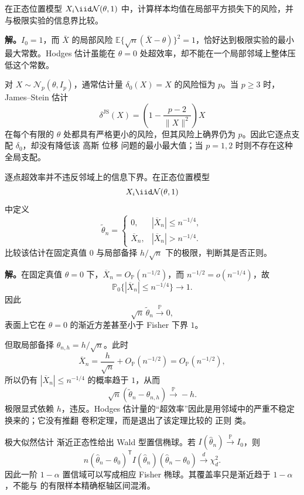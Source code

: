 \begin{workedexample}[均值在局部高斯实验中达到界]
在正态位置模型 $X_i\iid\mathcal N(\theta,1)$ 中，计算样本均值在局部平方损失下的风险，并与极限实验的信息界比较。

\textbf{解。}$I_0=1$，而 $\bar X$ 的局部风险 $\mathbb E\{\sqrt n(\bar X-\theta)\}^2=1$，恰好达到极限实验的最小最大常数。Hodges 估计虽能在 $\theta=0$ 处超效率，却不能在一个局部邻域上整体压低这个常数。
\end{workedexample}

\begin{proposition}
对 $X\sim\mathcal N_p(\theta,I_p)$，通常估计量 $\delta_0(X)=X$ 的风险恒为 $p$。当 $p\ge3$ 时，James--Stein 估计
\[
  \delta^{\mathrm{JS}}(X)=\left(1-\frac{p-2}{\|X\|^2}\right)X
\]
在每个有限的 $\theta$ 处都具有严格更小的风险，但其风险上确界仍为 $p$。因此它逐点支配 $\delta_0$，却没有降低该 高斯 位移 问题的最小最大值；当 $p=1,2$ 时则不存在这种全局支配。
\end{proposition}

\begin{workedexample}
逐点超效率并不违反邻域上的信息下界。在正态位置模型
\[
 X_i\iid\mathcal N(\theta,1)
\]
中定义
\[
 \widetilde\theta_n
 =\begin{cases}
 0,&|\overline X_n|\le n^{-1/4},\\
 \overline X_n,&|\overline X_n|>n^{-1/4}.
 \end{cases}
\]
比较该估计在固定真值 $0$ 与局部备择 $h/\sqrt n$ 下的极限，判断其是否正则。

\textbf{解。}在固定真值 $\theta=0$ 下，$\overline X_n=O_{\mathbb P}(n^{-1/2})$，而 $n^{-1/2}=o(n^{-1/4})$，故
\[
 \mathbb P_0\{|\overline X_n|\le n^{-1/4}\}\to1.
\]
因此
\[
 \sqrt n\,\widetilde\theta_n\xrightarrow{\mathbb P}0,
\]
表面上它在 $\theta=0$ 的渐近方差甚至小于 Fisher 下界 $1$。

但取局部备择 $\theta_{n,h}=h/\sqrt n$。此时
\[
 \overline X_n
 =\frac h{\sqrt n}+O_{\mathbb P}(n^{-1/2})
 =O_{\mathbb P}(n^{-1/2}),
\]
所以仍有 $|\overline X_n|\le n^{-1/4}$ 的概率趋于 $1$，从而
\[
 \sqrt n(\widetilde\theta_n-\theta_{n,h})
 \xrightarrow{\mathbb P}-h.
\]
极限显式依赖 $h$，违反。Hodges 估计量的“超效率”因此是用邻域中的严重不稳定换来的；它没有推翻 卷积定理，而是退出了该定理比较的 正则 类。
\end{workedexample}

\begin{corollary}
极大似然估计 渐近正态性给出 Wald 型置信椭球。若 $I(\widehat\theta_n)\xrightarrow{\mathbb P} I_0$，则
\[
 n(\widehat\theta_n-\theta_0)^{\mathsf T}
 I(\widehat\theta_n)
 (\widehat\theta_n-\theta_0)
 \xrightarrow{d}\chi^2_d.
\]
因此一阶 $1-\alpha$ 置信域可以写成相应 Fisher 椭球。其覆盖率只是渐近趋于 $1-\alpha$，不能与  的有限样本精确枢轴区间混淆。
\end{corollary}


